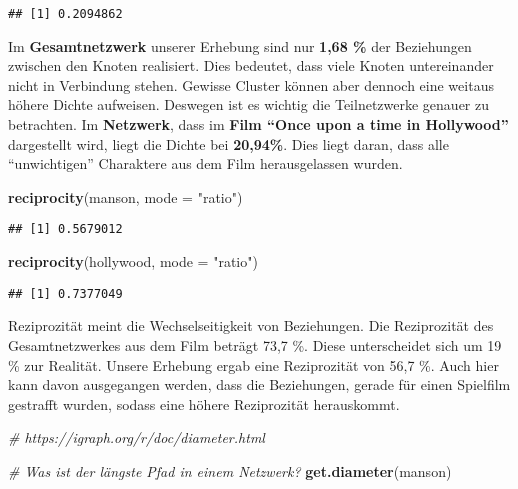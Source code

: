 \documentclass[
]{article}
\newenvironment{Shaded}{\begin{snugshade}}{\end{snugshade}}
\newcommand{\CommentTok}[1]{\textcolor[rgb]{0.56,0.35,0.01}{\textit{#1}}}
\newcommand{\DataTypeTok}[1]{\textcolor[rgb]{0.13,0.29,0.53}{#1}}
\newcommand{\KeywordTok}[1]{\textcolor[rgb]{0.13,0.29,0.53}{\textbf{#1}}}
\newcommand{\NormalTok}[1]{#1}
\newcommand{\StringTok}[1]{\textcolor[rgb]{0.31,0.60,0.02}{#1}}
\begin{document}
\begin{verbatim}
## [1] 0.2094862
\end{verbatim}

Im \textbf{Gesamtnetzwerk} unserer Erhebung sind nur \textbf{1,68 \%}
der Beziehungen zwischen den Knoten realisiert. Dies bedeutet, dass
viele Knoten untereinander nicht in Verbindung stehen. Gewisse Cluster
können aber dennoch eine weitaus höhere Dichte aufweisen. Deswegen ist
es wichtig die Teilnetzwerke genauer zu betrachten. Im
\textbf{Netzwerk}, dass im \textbf{Film ``Once upon a time in
Hollywood''} dargestellt wird, liegt die Dichte bei \textbf{20,94\%}.
Dies liegt daran, dass alle ``unwichtigen'' Charaktere aus dem Film
herausgelassen wurden.

\begin{Shaded}
\begin{Highlighting}[]
\KeywordTok{reciprocity}\NormalTok{(manson, }\DataTypeTok{mode =} \StringTok{"ratio"}\NormalTok{)}
\end{Highlighting}
\end{Shaded}

\begin{verbatim}
## [1] 0.5679012
\end{verbatim}

\begin{Shaded}
\begin{Highlighting}[]
\KeywordTok{reciprocity}\NormalTok{(hollywood, }\DataTypeTok{mode =} \StringTok{"ratio"}\NormalTok{)}
\end{Highlighting}
\end{Shaded}

\begin{verbatim}
## [1] 0.7377049
\end{verbatim}

Reziprozität meint die Wechselseitigkeit von Beziehungen. Die
Reziprozität des Gesamtnetzwerkes aus dem Film beträgt 73,7 \%. Diese
unterscheidet sich um 19 \% zur Realität. Unsere Erhebung ergab eine
Reziprozität von 56,7 \%. Auch hier kann davon ausgegangen werden, dass
die Beziehungen, gerade für einen Spielfilm gestrafft wurden, sodass
eine höhere Reziprozität herauskommt.

\begin{Shaded}
\begin{Highlighting}[]
\CommentTok{# https://igraph.org/r/doc/diameter.html}

\CommentTok{# Was ist der längste Pfad in einem Netzwerk?}
\KeywordTok{get.diameter}\NormalTok{(manson)}
\end{Highlighting}
\end{Shaded}
\end{document}
